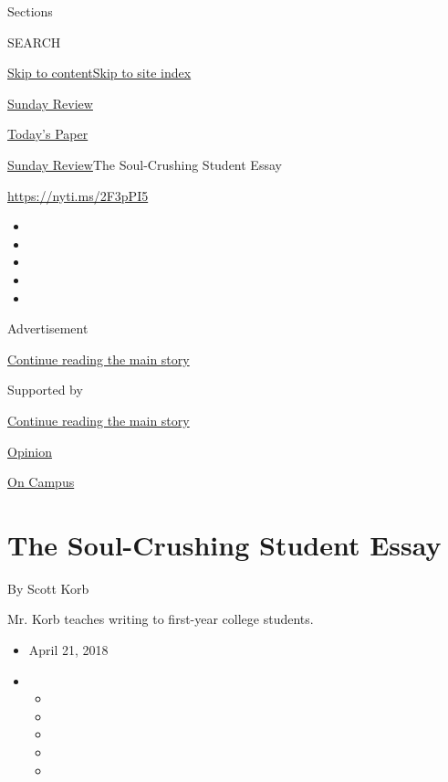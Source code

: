 Sections

SEARCH

\protect\hyperlink{site-content}{Skip to
content}\protect\hyperlink{site-index}{Skip to site index}

\href{https://www.nytimes.com/section/opinion/sunday}{Sunday Review}

\href{https://myaccount.nytimes.com/auth/login?response_type=cookie\&client_id=vi}{}

\href{https://www.nytimes.com/section/todayspaper}{Today's Paper}

\href{/section/opinion/sunday}{Sunday Review}\textbar{}The Soul-Crushing
Student Essay

\href{https://nyti.ms/2F3pPI5}{https://nyti.ms/2F3pPI5}

\begin{itemize}
\item
\item
\item
\item
\item
\end{itemize}

Advertisement

\protect\hyperlink{after-top}{Continue reading the main story}

Supported by

\protect\hyperlink{after-sponsor}{Continue reading the main story}

\href{/section/opinion}{Opinion}

\href{/column/on-campus}{On Campus}

\hypertarget{the-soul-crushing-student-essay}{%
\section{The Soul-Crushing Student
Essay}\label{the-soul-crushing-student-essay}}

By Scott Korb

Mr. Korb teaches writing to first-year college students.

\begin{itemize}
\item
  April 21, 2018
\item
  \begin{itemize}
  \item
  \item
  \item
  \item
  \item
  \end{itemize}
\end{itemize}


